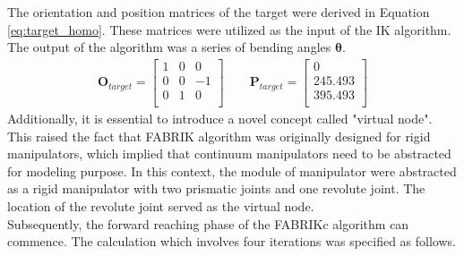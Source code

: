 \noindent The orientation and position matrices of the target were derived in Equation 
\ref{eq:target_homo}. These matrices were utilized as the input of the IK algorithm. The output of the algorithm 
was a series of bending angles $\boldsymbol{\theta}$.
\vspace{-5mm}
\begin{align}
    \textbf{O}_{target} = 
    \begin{bmatrix}
        1 & 0 & 0 \\
        0 & 0 & -1 \\
        0 & 1 & 0 \\
    \end{bmatrix} 
    \qquad
    \textbf{P}_{target} = 
    \begin{bmatrix}
        0 \\
        245.493 \\
        395.493 \\
    \end{bmatrix} 
    \label{eq:target_homo} 
\end{align}
Additionally, it is essential to introduce a novel concept called "virtual node". This raised the fact that FABRIK 
algorithm was originally designed for rigid manipulators, which implied that continuum manipulators need to be abstracted 
for modeling purpose. In this context, the module of manipulator were abstracted as a rigid manipulator with two prismatic 
joints and one revolute joint. The location of the revolute joint served as the virtual node. \\
Subsequently, the forward reaching phase of the FABRIKc algorithm can commence. The calculation which involves four 
iterations was specified as follows.
